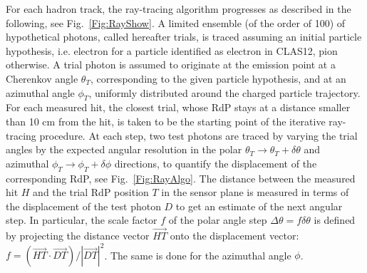 For each hadron track, the ray-tracing algorithm progresses as described in the following, see Fig.~\ref{Fig:RayShow}. A limited ensemble (of the order of 100) of hypothetical photons, called hereafter trials, is traced assuming an initial particle hypothesis, i.e. electron for a particle identified as electron in CLAS12, pion otherwise. A trial photon is assumed to originate at the emission point at a Cherenkov angle $\theta_T$, corresponding to the given particle hypothesis, and at an azimuthal angle $\phi_T$, uniformly distributed around the charged particle trajectory. For each \MaPMT measured hit, the closest trial, whose RdP stays at a distance smaller than 10 cm from the hit, is taken to be the starting point of the iterative ray-tracing procedure. At each step, two test photons are traced by varying the trial angles by the expected angular resolution in the polar $\theta_T \rightarrow \theta_T + \delta \theta$ and azimuthal $\phi_T \rightarrow \phi_T + \delta \phi$ directions, to quantify the displacement of the corresponding RdP, see Fig.~\ref{Fig:RayAlgo}. The distance between the measured hit $H$ and the trial RdP position $T$ in the sensor plane is measured in terms of the displacement of the test photon $D$ to get an estimate of the next angular step. In particular, the scale factor $f$ of the polar angle step $\Delta \theta = f \delta \theta$ is defined by projecting the distance vector $\vec{HT}$ onto the displacement vector: $f=(\vec{HT}\cdot \vec {DT}) / |\vec{DT}|^2$. The same is done for the azimuthal angle $\phi$.

